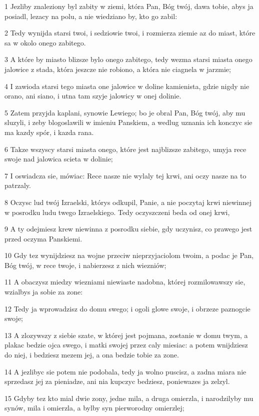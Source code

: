 \par 1 Jezliby znaleziony byl zabity w ziemi, która Pan, Bóg twój, dawa tobie, abys ja posiadl, lezacy na polu, a nie wiedziano by, kto go zabil:
\par 2 Tedy wynijda starsi twoi, i sedziowie twoi, i rozmierza ziemie az do miast, które sa w okolo onego zabitego.
\par 3 A które by miasto blizsze bylo onego zabitego, tedy wezma starsi miasta onego jalowice z stada, która jeszcze nie robiono, a która nie ciagnela w jarzmie;
\par 4 I zawioda starsi tego miasta one jalowice w doline kamienista, gdzie nigdy nie orano, ani siano, i utna tam szyje jalowicy w onej dolinie.
\par 5 Zatem przyjda kaplani, synowie Lewiego; bo je obral Pan, Bóg twój, aby mu sluzyli, i zeby blogoslawili w imieniu Panskiem, a wedlug uznania ich konczyc sie ma kazdy spór, i kazda rana.
\par 6 Takze wszyscy starsi miasta onego, które jest najblizsze zabitego, umyja rece swoje nad jalowica scieta w dolinie;
\par 7 I oswiadcza sie, mówiac: Rece nasze nie wylaly tej krwi, ani oczy nasze na to patrzaly.
\par 8 Oczysc lud twój Izraelski, którys odkupil, Panie, a nie poczytaj krwi niewinnej w posrodku ludu twego Izraelskiego. Tedy oczyszczeni beda od onej krwi,
\par 9 A ty odejmiesz krew niewinna z posrodku siebie, gdy uczynisz, co prawego jest przed oczyma Panskiemi.
\par 10 Gdy tez wynijdziesz na wojne przeciw nieprzyjaciolom twoim, a podac je Pan, Bóg twój, w rece twoje, i nabierzesz z nich wiezniów;
\par 11 A obaczysz miedzy wiezniami niewiaste nadobna, której rozmilowawszy sie, wzialbys ja sobie za zone:
\par 12 Tedy ja wprowadzisz do domu swego; i ogoli glowe swoje, i obrzeze paznogcie swoje;
\par 13 A zlozywszy z siebie szate, w której jest pojmana, zostanie w domu twym, a plakac bedzie ojca swego, i matki swojej przez caly miesiac: a potem wnijdziesz do niej, i bedziesz mezem jej, a ona bedzie tobie za zone.
\par 14 A jezlibyc sie potem nie podobala, tedy ja wolno puscisz, a zadna miara nie sprzedasz jej za pieniadze, ani nia kupczyc bedziesz, poniewazes ja zelzyl.
\par 15 Gdyby tez kto mial dwie zony, jedne mila, a druga omierzla, i narodzilyby mu synów, mila i omierzla, a bylby syn pierworodny omierzlej;
